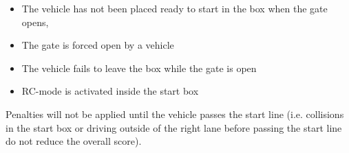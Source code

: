 \begin{itemize}
	\item The vehicle has not been placed ready to start in the box when the gate opens,
	\item The gate is forced open by a vehicle
	\item The vehicle fails to leave the box while the gate is open
	\item RC-mode is activated inside the start box
\end{itemize}

Penalties will not be applied until the vehicle passes the start line (i.e.
collisions in the start box or driving outside of the right lane before passing
the start line do not reduce the overall score).

%
%
